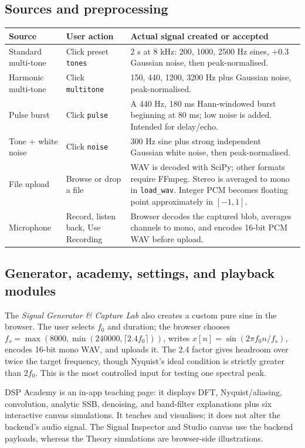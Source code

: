\documentclass[11pt,a4paper]{article}
\newcommand{\code}[1]{\texttt{#1}}
\begin{document}
\subsection{Sources and preprocessing}
\begin{longtable}{p{.21\linewidth}p{.36\linewidth}p{.35\linewidth}}
\toprule Source & User action & Actual signal created or accepted \\\midrule
Standard multi-tone & Click preset \code{tones} & 2 s at 8 kHz: 200, 1000, 2500 Hz sines, \(+0.3\) Gaussian noise, then peak-normalised.\\
Harmonic multi-tone & Click \code{multitone} & 150, 440, 1200, 3200 Hz plus Gaussian noise, peak-normalised.\\
Pulse burst & Click \code{pulse} & A 440 Hz, 180 ms Hann-windowed burst beginning at 80 ms; low noise is added. Intended for delay/echo.\\
Tone + white noise & Click \code{noise} & 300 Hz sine plus strong independent Gaussian white noise, then peak-normalised.\\
File upload & Browse or drop a file & WAV is decoded with SciPy; other formats require FFmpeg. Stereo is averaged to mono in \code{load\_wav}. Integer PCM becomes floating point approximately in \([-1,1]\).\\
Microphone & Record, listen back, Use Recording & Browser decodes the captured blob, averages channels to mono, and encodes 16-bit PCM WAV before upload.\\
\bottomrule
\end{longtable}

\subsection{Generator, academy, settings, and playback modules}
The \emph{Signal Generator \& Capture Lab} also creates a custom pure sine in the browser. The user selects \(f_0\) and duration; the browser chooses \(f_s=\max(8000,\min(240000,\lceil2.4f_0\rceil))\), writes \(x[n]=\sin(2\pi f_0n/f_s)\), encodes 16-bit mono WAV, and uploads it. The 2.4 factor gives headroom over twice the target frequency, though Nyquist's ideal condition is strictly greater than \(2f_0\). This is the most controlled input for testing one spectral peak.

DSP Academy is an in-app teaching page: it displays DFT, Nyquist/aliasing, convolution, analytic SSB, denoising, and band-filter explanations plus six interactive canvas simulations. It teaches and visualises; it does not alter the backend's audio signal. The Signal Inspector and Studio canvas use the backend payloads, whereas the Theory simulations are browser-side illustrations.
\end{document}
